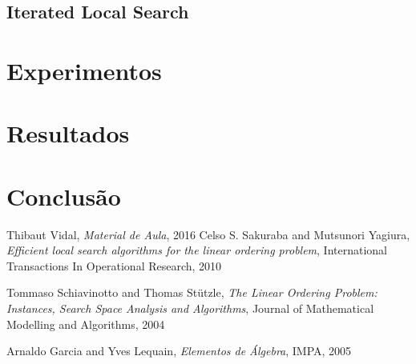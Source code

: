 \documentclass[a4paper,10pt,twocolumn]{article}
\begin{document}
\subsection{Iterated Local Search}
\section{Experimentos}
\section{Resultados}
\section{Conclusão}

\begin{thebibliography}{99}
  Thibaut Vidal,
  \emph{Material de Aula},
  2016
 Celso S. Sakuraba and Mutsunori Yagiura,
 \emph{Efficient local search algorithms for the linear
ordering problem},
 International Transactions In Operational Research,
 2010

  Tommaso Schiavinotto and Thomas Stützle,
  \emph{The Linear Ordering Problem: Instances, Search
Space Analysis and Algorithms},
  Journal of Mathematical Modelling and Algorithms,
  2004

  Arnaldo Garcia and Yves Lequain,
  \emph{Elementos de Álgebra},
  IMPA,
  2005


\end{thebibliography}
\end{document}
